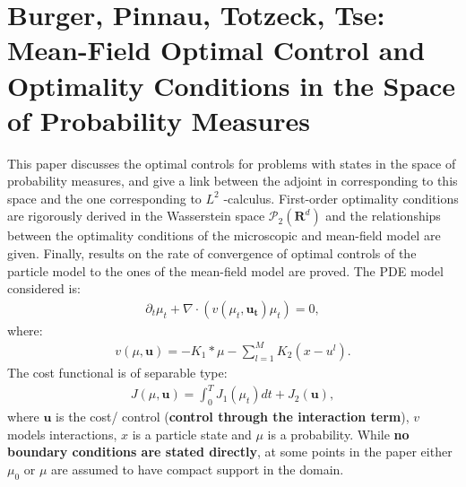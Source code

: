 \documentclass[11pt, a4paper]{article}
\theoremstyle{definition}
\begin{document}
\section{Burger, Pinnau, Totzeck, Tse: Mean-Field Optimal Control and Optimality Conditions in the Space of Probability Measures \cite{burger2019meanfield}}
This paper discusses the optimal controls for problems with states in the space of probability measures, and give a link between the adjoint in corresponding to this space and the one corresponding to $L^2$ -calculus.  First-order optimality conditions are rigorously derived in the Wasserstein space $\mathcal{P}_2(\mathbf{R}^d)$ and the relationships between the optimality conditions of the microscopic and mean-field model are given.
Finally, results on the rate of convergence of optimal controls of the particle model to the ones of the mean-field model are proved.
The PDE model considered is:
\begin{align*}
\partial_t \mu_t + \nabla \cdot (v(\mu_t,\mathbf{u_t})\mu_t) =0,
\end{align*}
where:
\begin{align*}
v(\mu, \mathbf{u}) = - K_1 \ast \mu - \sum_{l=1}^M K_2 (x-u^l).
\end{align*}
The cost functional is of separable type:
\begin{align*}
J(\mu, \mathbf{u}) = \int_0^T J_1(\mu_t)dt + J_2(\mathbf{u}),
\end{align*}
where $\mathbf{u}$ is the cost/ control (\textbf{control through the interaction term}), $v$ models interactions, $x$ is a particle state and $\mu$ is a probability.
While \textbf{no boundary conditions are stated directly}, at some points in the paper either $\mu_0$ or $\mu$ are assumed to have compact support in the domain.
\end{document}
